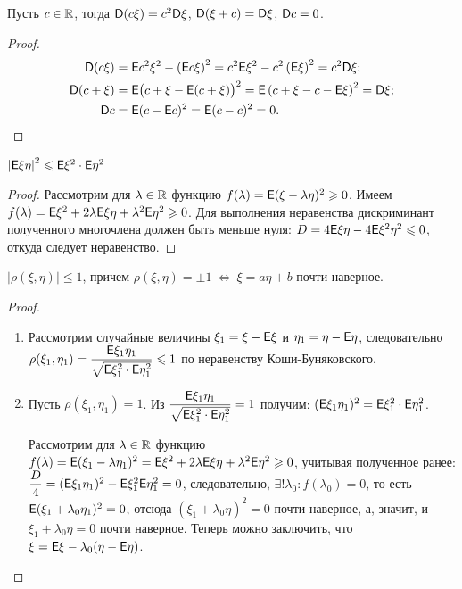 \begin{property}
	Пусть $c \in \mathbb{R}$, тогда $\mathsf{D} (c \xi ) = c^2 \mathsf{D} \xi$, $\mathsf{D} (\xi + c ) =  \mathsf{D} \xi$, $\mathsf{D} c = 0$.
	\begin{proof}
		\vspace{-2pc}
		\begin{align*}
			\mathsf{D} (c \xi ) &= \mathsf{E} c^2 \xi^2 - \left( \mathsf{E} c \xi \right)^2 = c^2 \mathsf{E} \xi^2 - c^2 \left( \mathsf{E} \xi \right)^2 = c^2 \mathsf{D} \xi;\\
			\mathsf{D} ( c + \xi ) &= \mathsf{E} \big( c + \xi - \mathsf{E} ( c + \xi ) \big)^2 = \mathsf{E} \left( c + \xi - c - \mathsf{E} \xi  \right)^2 = \mathsf{D} \xi; \\
			\mathsf{D} c &= \mathsf{E} (c - \mathsf{E} c )^2 = \mathsf{E} (c - c)^2 = 0. \qedhere
		\end{align*} 
	\end{proof}
\end{property}

\begin{property}
	$\left| \mathsf{E} \xi \eta \right|^2 \leqslant \mathsf{E} \xi^2 \cdot \mathsf{E} \eta^2$
	\begin{proof}
		Рассмотрим для $\lambda \in \mathbb{R}$ функцию $f( \lambda ) = \mathsf{E} (\xi - \lambda \eta)^2 \geqslant 0$. Имеем $f( \lambda ) = \mathsf{E} \xi^2 + 2 \lambda \mathsf{E} \xi \eta + \lambda^2 \mathsf{E} \eta^2 \geqslant 0$. Для выполнения неравенства дискриминант  полученного многочлена должен быть меньше нуля: $D = 4 \mathsf{E} \xi \eta - 4 \mathsf{E} \xi^2 \eta^2 \leqslant 0$, откуда следует неравенство.
	\end{proof}
\end{property}

\begin{property}
	$| \rho (\xi , \eta ) | \leqslant 1$, причем $\rho ( \xi , \eta ) = \pm 1 ~\Leftrightarrow~ \xi = a \eta + b$ почти наверное.
	\begin{proof}
	    \begin{enumerate}
    		\item Рассмотрим случайные величины $\xi_1 = \xi - \mathsf{E} \xi$ и $\eta_1 = \eta - \mathsf{E} \eta$, следовательно $\rho ( \xi_1 , \eta_1 ) = \dfrac{\mathsf{E} \xi_1 \eta_1}{\sqrt{\mathsf{E} \xi_1^2 \cdot \mathsf{E} \eta_1^2}} \leqslant 1$ по неравенству Коши-Буняковского. 
    		
    		\item Пусть $\rho (\xi_1, \eta_1) = 1$. Из $\dfrac{\mathsf{E} \xi_1 \eta_1}{\sqrt{\mathsf{E} \xi_1^2 \cdot \mathsf{E} \eta_1^2}} = 1$ получим: $(\mathsf{E} \xi_1 \eta_1)^2 = \mathsf{E} \xi_1^2 \cdot \mathsf{E} \eta_1^2$.
    		
    		Рассмотрим для $\lambda \in \mathbb{R}$ функцию $f( \lambda ) = \mathsf{E} (\xi_1 - \lambda \eta_1)^2 = \mathsf{E} \xi^2 + 2 \lambda \mathsf{E} \xi \eta + \lambda^2 \mathsf{E} \eta^2 \geqslant 0$, учитывая полученное ранее: $\dfrac{D}{4} = (\mathsf{E}\xi_1\eta_1)^2 - \mathsf{E}\xi_1^2\mathsf{E}\eta_1^2 = 0$, следовательно, $\exists !\lambda_0: f(\lambda_0) = 0$,  то есть $\mathsf{E} ( \xi_1 + \lambda_0 \eta_1 )^2 = 0$, отсюда $(\xi_1 + \lambda_0 \eta )^2 = 0$ почти наверное, а, значит, и $\xi_1 + \lambda_0 \eta  = 0$ почти наверное. Теперь можно заключить, что $\xi = \mathsf{E} \xi - \lambda_0 (\eta - \mathsf{E} \eta )$.
		\end{enumerate}
	\end{proof}
\end{property}


